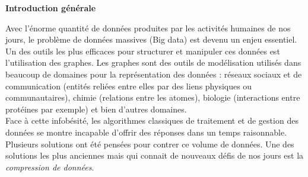 \documentclass[a4paper,oneside,12pt]{report}
\theoremstyle{definition}
\begin{document}





 

\pagestyle{plain}
\tableofcontents
\newpage



\listoffigures
{}
\cleardoublepage


\listoftables
{}



\printglossaries



\cleardoublepage



	\thispagestyle{plain}
		\Huge{ 
			\textbf {Introduction générale}} \\[0.5in]
			\normalsize
			Avec l'énorme quantité de données produites par les activités humaines de nos jours, le problème de données massives (Big data) est devenu un enjeu essentiel. Un des outils les plus efficaces pour structurer et manipuler ces données est l'utilisation des graphes. Les graphes sont des outils de modélisation utilisés dans beaucoup de domaines pour la représentation des données : réseaux sociaux et de communication (entités reliées entre elles par des liens physiques ou communautaires), chimie (relations entre les atomes), biologie (interactions entre protéines par exemple) et bien d'autres domaines.\\
			
	Face à cette infobésité, les algorithmes classiques de traitement et de gestion des données se montre incapable d'offrir des réponses dans un temps raisonnable. Plusieurs solutions ont été pensées pour contrer ce volume de données. Une des solutions les plus anciennes mais qui connait de nouveaux défis de nos jours est la \textit{ compression de données}.\\
\end{document}
